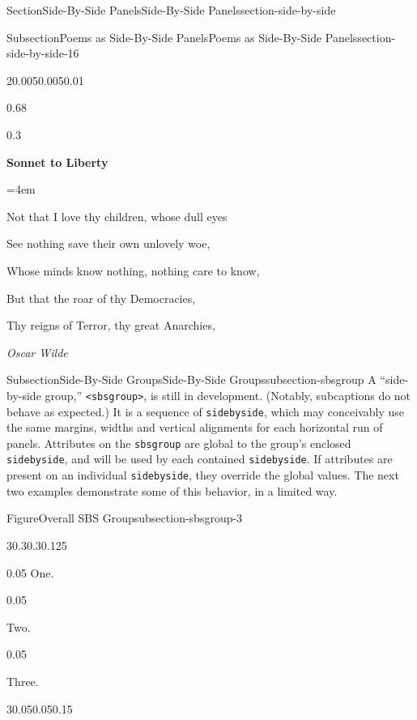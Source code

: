 \documentclass[twoside,10pt,]{article}
\newcommand{\mono}[1]{\texttt{#1}}
\numberwithin{equation}{section}
\newenvironment{poem}{\setlength{\parindent}{0em}}{}
\newcommand{\poemTitle}[1]{\begin{center}\large\textbf{#1}\end{center}}
\newenvironment{stanza}{\vspace{0.25 em}\hangindent=4em}{\vspace{1 em}}
\newcommand{\poemauthorleft}[1]{\vspace{-1em}\begin{flushleft}\textit{#1}\end{flushleft}}
\newcommand{\poemlineleft}[1]{{\raggedright{#1}\par}\vspace{-\parskip}}
\begin{document}
\begin{sectionptx}{Section}{Side-By-Side Panels}{}{Side-By-Side Panels}{}{}{section-side-by-side}
\begin{subsectionptx}{Subsection}{Poems as Side-By-Side Panels}{}{Poems as Side-By-Side Panels}{}{}{section-side-by-side-16}
\begin{sidebyside}{2}{0.005}{0.005}{0.01}
\begin{sbspanel}{0.68}
\begin{poem}
\end{poem}
\end{sbspanel}%
\begin{sbspanel}{0.3}%
\begin{poem}%
\poemTitle{Sonnet to Liberty}
\begin{stanza}
\poemlineleft{Not that I love thy children, whose dull eyes}
\poemlineleft{See nothing save their own unlovely woe,}
\poemlineleft{Whose minds know nothing, nothing care to know,}
\poemlineleft{But that the roar of thy Democracies,}
\poemlineleft{Thy reigns of Terror, thy great Anarchies,}
\poemlineleft{\textellipsis{}}
\end{stanza}
\poemauthorleft{Oscar Wilde}
\end{poem}
\end{sbspanel}%
\end{sidebyside}%
\end{subsectionptx}
%
%
\typeout{************************************************}
\typeout{************************************************}
%
\begin{subsectionptx}{Subsection}{Side-By-Side Groups}{}{Side-By-Side Groups}{}{}{subsection-sbsgroup}
A ``side-by-side group,'' \mono{<sbsgroup>}, is still in development.  (Notably, subcaptions do not behave as expected.)  It is a sequence of \mono{sidebyside}, which may conceivably use the same margins, widths and vertical alignments for each horizontal run of panels.  Attributes on the \mono{sbsgroup} are global to the group's enclosed \mono{sidebyside}, and will be used by each contained \mono{sidebyside}.  If attributes are present on an individual \mono{sidebyside}, they override the global values.  The next two examples demonstrate some of this behavior, in a limited way.%
\begin{figureptx}{Figure}{Overall SBS Group}{subsection-sbsgroup-3}{}%
\centering
\begin{sidebyside}{3}{0.3}{0.3}{0.125}%
\begin{sbspanel}{0.05}%
One.%
\end{sbspanel}%
\begin{sbspanel}{0.05}%
\par
Two.%
\end{sbspanel}%
\begin{sbspanel}{0.05}%
\par
Three.%
\end{sbspanel}%
\end{sidebyside}%
\begin{sidebyside}{3}{0.05}{0.05}{0.15}%

\end{sidebyside}
\end{figureptx}
\end{subsectionptx}
\end{sectionptx}
\end{document}
